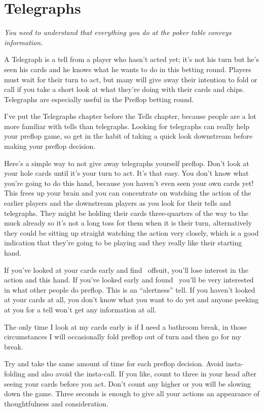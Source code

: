 \chapter{Telegraphs}

\textit{You need to understand that everything you do at the poker
table conveys information.}


A Telegraph is a tell from a player who hasn't acted yet; it's not his
turn but he's seen his cards and he knows what he wants to do in this
betting round. Players must wait for their turn to act, but many will
give away their intention to fold or call if you take a short look at
what they're doing with their cards and chips. Telegraphs are
especially useful in the Preflop betting round.

I've put the Telegraphs chapter before the Tells chapter,
because people are a lot more familiar with tells than
telegraphs. Looking for telegraphs can really help your preflop game,
so get in the habit of taking a quick look downstream before
making your preflop decision.

Here's a simple way to not give away telegraphs yourself preflop.
Don't look at your hole cards until it's your turn to act. It's that easy.
You don't know what you're going to do this hand, because
you haven't even seen your own cards yet! This frees up your brain
and you can concentrate on watching the action of the earlier players
and the downstream players as you look for their tells and telegraphs.
They might be holding their cards three-quarters of the way to the
muck already so it's not a long toss for them when it is their
turn, alternatively they could be sitting up straight watching
the action very closely, which is a good indication that they're
going to be playing and they really like their starting hand.

If you've looked at your cards early and find \sevh\trec\ offsuit,
you'll lose interest in the action and this hand. If you've looked
early and found \Ks\Kc\ you'll be very interested in what other people
do preflop. This is an ``alertness'' tell. If you haven't looked at
your cards at all, you don't know what you want to do yet and anyone
peeking at you for a tell won't get any information at all.

The only time I look at my cards early is if I need a bathroom break,
in those circumstances I will occasionally fold preflop out of turn
and then go for my break.

Try and take the same amount of time for each preflop decision.
Avoid insta-folding and also avoid the insta-call. If you like,
count to three in your head after seeing your cards before you act.
Don't count any higher or you will be slowing down the game. Three
seconds is enough to give all your actions an appearance of
thoughtfulness and consideration.

